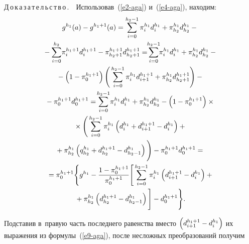 \begin{multicols}{2}
\noindent
Д\,о\,к\,а\,з\,а\,т\,е\,л\,ь\,с\,т\,в\,о\,.\ \  Использовав~(\ref{e2-aga}) 
и~(\ref{e4-aga}), находим:
\begin{multline*}
g^{h_1}(a) -g^{h_1+1}(a)=\sum\limits_{i=0}^{h_2-1} \pi_i^{h_1} d_i^{h_1} 
+\pi_{h_2}^{h_1} d_{h_2}^{h_1} -{}\\
{}- 
   \sum\limits_{i=0}^{h_2} \!\pi_i^{h_1+1} d_i^{h_1+1} -\pi_{h_2+1}^{h_1+1} d_{h_2+1}^{h_1+1} = \!\!
\sum\limits_{i=0}^{h_2-1} \!\!\pi_i^{h_1} d_i^{h_1} +\pi_{h_2}^{h_1} d_{h_2}^{h_1}-{}\\
   {}-
   \left( 1-\pi_0^{h_1+1}\right) \Bigg(  \sum\limits_{i=0}^{h_2-1} \pi_i^{h_1} d_{i+1}^{h_1+1} 
+\pi_{h_2}^{h_1} d_{h_2+1}^{h_1+1}\Bigg) -{}\\
{}- \pi_0^{h_1+1} d_0^{h_1+1}=\!
   \sum\limits_{i=0}^{h_2-1} \!\pi_i^{h_1} d_i^{h_1} +\pi^{h_1}_{h_2} d^{h_1}_{h_2} -\left( 1-
\pi_0^{h_1+1}\right) \times{}\\
   {}\times
   \Bigg(  \sum\limits_{i=0}^{h_2-1} \pi_i^{h_1} \left( d_i^{h_1} +d_{i+1}^{h_1+1} - d_i^{h_1}\right) + {}\\
   {}+
   \pi^{h_1}_{h_2} \left( q^{h_1}_{h_2} +d^{h_1+1}_{h_2} -d^{h_1}_{h_2-1}\right)\Bigg)-
   \pi_0^{h_1+1} d_0^{h_1+1} ={}\\
   {}= \pi_0^{h_1+1}\Bigg\{ 
   g^{h_1} -\displaystyle\frac{\displaystyle 1-\pi_0^{h_1+1}\mathstrut}{\displaystyle \pi_0^{h_1+1}\mathstrut} \Bigg[ \sum\limits_{i=0}^{h_2-1} \pi_i^{h_1} \left( 
d_{i+1}^{h_1+1} -d_i^{h_1}\right)+{}\\
   {}+ \pi_{h_2}^{h_1} \left( d_{h_2}^{h_1+1} -d^{h_1}_{h_2-1} \right)\Bigg] -d_0^{h_1+1}\Bigg\}.
   \end{multline*}
   
    
  
  Подставив в~правую часть последнего равенства вместо $\left( 
d_{i+1}^{h_1+1}\hm- d_i^{h_1}\right)$ их выражения из  
формулы~(\ref{e9-aga}), после несложных преобразований получим


\end{multicols}
